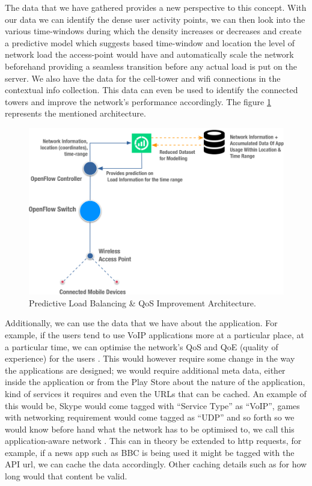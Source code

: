 \documentclass[prodmode,acmtecs]{acmsmall}
\begin{document}
The data that we have gathered provides a new perspective to this concept. With our data we can identify the dense user activity points, we can then look into the various time-windows during which the density increases or decreases and create a predictive model which suggests based time-window and location the level of network load the access-point would have and automatically scale the network beforehand providing a seamless transition before any actual load is put on the server. We also have the data for the cell-tower and wifi connections in the contextual info collection. This data can even be used to identify the connected towers and improve the network's performance accordingly. The figure \ref{fig:openflowarch2} represents the mentioned architecture.
\begin{figure}[bhtp]
 \centering
 \includegraphics[width=120mm]{openflow-2.png}
  \caption {Predictive Load Balancing \& QoS Improvement Architecture.}
 \label{fig:openflowarch2}
\end{figure}

Additionally, we can use the data that we have about the application. For example, if the users tend to use VoIP applications more at a particular place, at a particular time, we can optimise the network's QoS and QoE (quality of experience) for the users \cite{2013aricent}. This would however require some change in the way the applications are designed; we would require additional meta data, either inside the application or from the Play Store about the nature of the application, kind of services it requires and even the URLs that can be cached. An example of this would be, Skype would come tagged with ``Service Type'' as ``VoIP'', games with networking requirement would come tagged as ``UDP'' and so forth so we would know before hand what the network has to be optimised to, we call this application-aware network \cite{2013aricent}. This can in theory be extended to http requests, for example, if a news app such as BBC is being used it might be tagged with the API url, we can cache the data accordingly. Other caching details such as for how long would that content be valid. 
\end{document}

